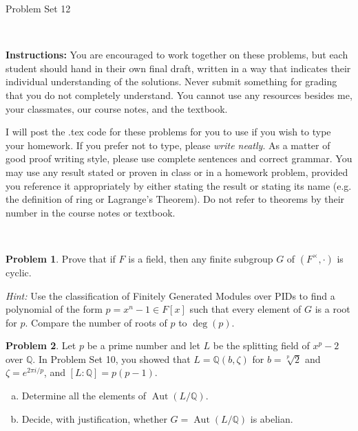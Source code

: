 \documentclass[11pt]{article}
\title{}
\date{\vspace{-0.5in}}
\DeclareMathOperator{\Aut}{Aut}
\newcommand{\Q}{\mathbb{Q}}
\theoremstyle{definition}
\newtheorem{problem}{Problem}
\begin{document}
\thispagestyle{fancy}
\pagestyle{fancy}

\vspace{3em}

\begin{center}
	{\LARGE Problem Set 12}
\end{center}

\

\noindent
{\bf Instructions:}
You are encouraged to work together on these problems, but each student should hand in their own final draft, written in a way that indicates their individual understanding of the solutions. Never submit something for grading that you do not completely understand. You cannot use any resources besides me, your classmates, our course notes, and the textbook.


I will post the .tex code for these problems for you to use if you wish to type your homework. If you prefer not to type, please  {\em write neatly}. As a matter of good proof writing style, please use complete sentences and correct grammar. You may use any result  stated or proven in class or in a homework problem, provided you reference it appropriately by either stating the result or stating its name (e.g. the definition of ring or Lagrange's Theorem). Do not refer to theorems by their number in the course notes or textbook.


\


\begin{problem}
Prove that if $F$ is a field, then any finite subgroup $G$ of $(F^\times,\cdot)$  is cyclic.

\noindent
{\em Hint:} Use the classification of Finitely Generated Modules over PIDs to find a polynomial of the form $p = x^n-1 \in F[x]$ such that every element of $G$ is a root for $p$. Compare the number of roots of $p$ to $\deg(p)$.
\end{problem}



\begin{problem}
Let $p$ be a prime number and let $L$ be the splitting field of $x^p-2$ over $\Q$. In Problem Set 10, you showed that $L = \Q(b,\zeta)$ for $b = \sqrt[p]{2}$ and $\zeta = e^{2\pi i/p}$, and $[L : \Q] = p(p-1)$.
\begin{enumerate}[a)]
\item  Determine all the elements of $\Aut(L/\Q)$.

\item Decide, with justification, whether $G=\Aut(L/\Q)$ is abelian.
\end{enumerate}
\end{problem}
\end{document}
